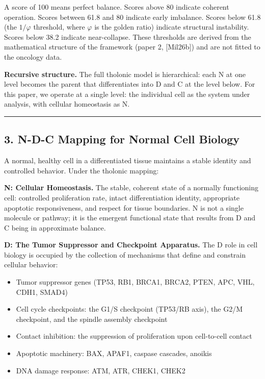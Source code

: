 \documentclass[
  11pt,
  letterpaper,
]{article}
\providecommand{\tightlist}{%
  \setlength{\itemsep}{0pt}\setlength{\parskip}{0pt}}
\begin{document}
A score of 100 means perfect balance. Scores above 80 indicate coherent
operation. Scores between 61.8 and 80 indicate early imbalance. Scores
below 61.8 (the \(1/\varphi\) threshold, where \(\varphi\) is the golden
ratio) indicate structural instability. Scores below 38.2 indicate
near-collapse. These thresholds are derived from the mathematical
structure of the framework (paper 2, {[}Mil26b{]}) and are not fitted to
the oncology data.

\textbf{Recursive structure.} The full tholonic model is hierarchical:
each N at one level becomes the parent that differentiates into D and C
at the level below. For this paper, we operate at a single level: the
individual cell as the system under analysis, with cellular homeostasis
as N.

\begin{center}\rule{0.5\linewidth}{0.5pt}\end{center}

\subsection{3. N-D-C Mapping for Normal Cell
Biology}\label{n-d-c-mapping-for-normal-cell-biology}

A normal, healthy cell in a differentiated tissue maintains a stable
identity and controlled behavior. Under the tholonic mapping:

\textbf{N: Cellular Homeostasis.} The stable, coherent state of a
normally functioning cell: controlled proliferation rate, intact
differentiation identity, appropriate apoptotic responsiveness, and
respect for tissue boundaries. N is not a single molecule or pathway; it
is the emergent functional state that results from D and C being in
approximate balance.

\textbf{D: The Tumor Suppressor and Checkpoint Apparatus.} The D role in
cell biology is occupied by the collection of mechanisms that define and
constrain cellular behavior:

\begin{itemize}
\tightlist
\item
  Tumor suppressor genes (TP53, RB1, BRCA1, BRCA2, PTEN, APC, VHL, CDH1,
  SMAD4)
\item
  Cell cycle checkpoints: the G1/S checkpoint (TP53/RB axis), the G2/M
  checkpoint, and the spindle assembly checkpoint
\item
  Contact inhibition: the suppression of proliferation upon cell-to-cell
  contact
\item
  Apoptotic machinery: BAX, APAF1, caspase cascades, anoikis
\item
  DNA damage response: ATM, ATR, CHEK1, CHEK2
\end{itemize}
\end{document}
